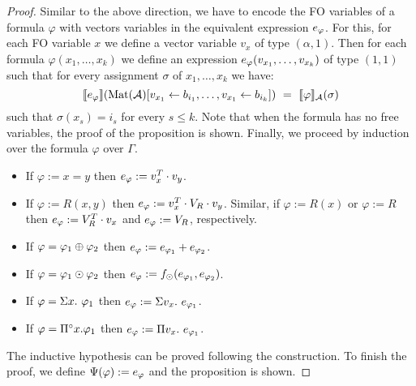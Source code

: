 \begin{proof}
Similar to the above direction, we have to encode the FO variables of a formula $\varphi$ with vectors variables in the equivalent \langprod expression $e_\varphi$. For this, for each FO variable $x$ we define a vector variable $v_x$ of type $(\alpha, 1)$. Then for each formula $\varphi(x_1, \ldots, x_k)$ we define an expression $e_\varphi(v_{x_1}, \ldots, v_{x_k})$ of type $(1,1)$ such that for every assignment $\sigma$ of $x_1, \ldots, x_k$ we have:
$$
\sem{\evarphi}{\text{Mat}(\cA)[v_{x_1} \gets b_{i_1},\ldots,v_{x_1}\gets b_{i_k}]} \ = \ \ssem{\varphi}{\cA}(\sigma) 
$$
such that $\sigma(x_{s}) = i_s$ for every $s \leq k$. Note that when the formula has no free variables, the proof of the proposition is shown. Finally, we proceed by induction over the formula $\varphi$ over $\Gamma$.
\begin{itemize} \itemsep3mm
  \item If $\varphi:=x=y$ then $e_\varphi:= v_x^T \cdot v_{y}$.
  \item If $\varphi:=R(x,y)$ then $e_\varphi:=v_x^T \cdot V_R \cdot v_{y}$. Similar, if $\varphi:=R(x)$ or $\varphi:=R$ then $e_\varphi:= V_R^T \cdot v_{x}$  and $e_\varphi:= V_R$, respectively. 
  \item If $\varphi = \varphi_1 \oplus \varphi_2$ then $e_\varphi:= e_{\varphi_1} + e_{\varphi_2}$.
  \item If $\varphi = \varphi_1 \odot \varphi_2$ then $e_\varphi:= f_\odot(e_{\varphi_1},e_{\varphi_2})$.
  \item If $\varphi = \Sigma x.\  \varphi_1$ then $e_\varphi :=\Sigma v_x.\ e_{\varphi_1}$.
  \item If $\varphi = \Pi^{\circ} x. \varphi_1$ then $e_\varphi := \Pi v_x.\ e_{\varphi_1}$.
\end{itemize}
The inductive hypothesis can be proved following the construction. To finish the proof, we define $\Psi(\varphi) := e_\varphi$ and the proposition is shown.

\end{proof}
